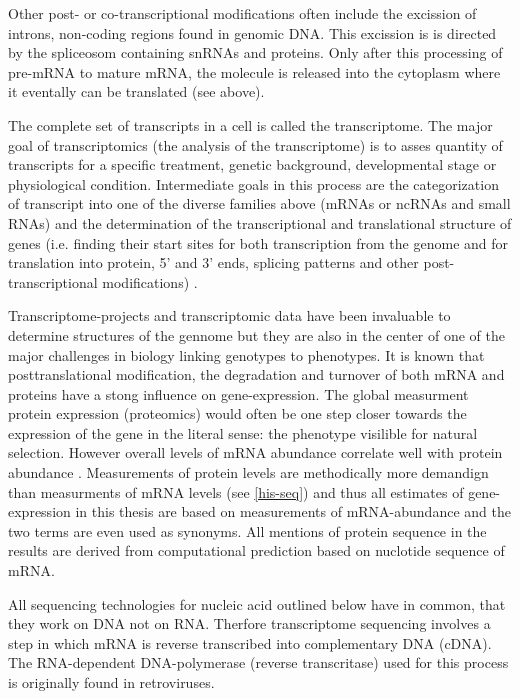 Other post- or co-transcriptional modifications often include the
excission of introns, non-coding regions found in genomic DNA. This
excission is is directed by the spliceosom containing snRNAs and
proteins. Only after this processing of pre-mRNA to mature mRNA, the
molecule is released into the cytoplasm where it eventally can be
translated (see above).

The complete set of transcripts in a cell is called the
transcriptome. The major goal of transcriptomics (the analysis of the
transcriptome) is to asses quantity of transcripts for a specific
treatment, genetic background, developmental stage or physiological
condition. Intermediate goals in this process are the categorization
of transcript into one of the diverse families above (mRNAs or ncRNAs
and small RNAs) and the determination of the transcriptional and
translational structure of genes (i.e. finding their start sites for
both transcription from the genome and for translation into protein,
5' and 3' ends, splicing patterns and other post-transcriptional
modifications) \cite{pmid19015660}.

Transcriptome-projects and transcriptomic data have been invaluable to
determine structures of the gennome but they are also in the center of
one of the major challenges in biology linking genotypes to
phenotypes. It is known that posttranslational modification, the
degradation and turnover of both mRNA and proteins have a stong
influence on gene-expression. The global measurment protein expression
(proteomics) would often be one step closer towards the expression of
the gene in the literal sense: the phenotype visilible for natural
selection. However overall levels of mRNA abundance correlate well
with protein abundance \cite{pmid21593866}. Measurements of protein
levels are methodically more demandign than measurments of mRNA levels
(see \ref{his-seq}) and thus all estimates of gene-expression in this
thesis are based on measurements of mRNA-abundance and the two terms
are even used as synonyms. All mentions of protein sequence in the
results are derived from computational prediction based on nuclotide
sequence of mRNA.

All sequencing technologies for nucleic acid outlined below have in
common, that they work on DNA not on RNA. Therfore transcriptome
sequencing involves a step in which mRNA is reverse transcribed into
complementary DNA (cDNA). The RNA-dependent DNA-polymerase (reverse
transcritase) used for this process is originally found in
retroviruses.

